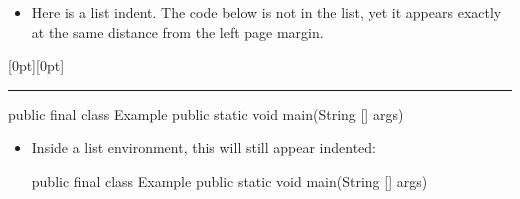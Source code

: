 \documentclass[polish]{article}
\begin{document}
\begin{itemize}
	\item Here is a list indent. The code below is not in the list, yet it appears
	exactly at the same distance from the left page margin.
\end{itemize}

\noindent\hspace{\leftmargin}\raisebox{0pt}[0pt][0pt]{\rule{0.5pt}{50pt}}

\begin{mjavablock}
public final class Example {
	public static void main(String [] args) {
	}
}
\end{mjavablock}

\begin{itemize}
	\item Inside a list environment, this will still appear indented:
\begin{mjavablock}
public final class Example {
	public static void main(String [] args) {
	}
}
\end{mjavablock}
\end{itemize}
\end{document}
